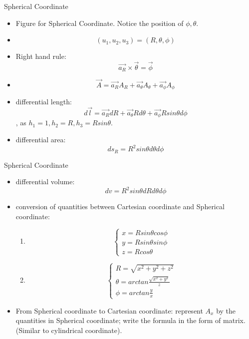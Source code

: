 \documentclass[xcolor={dvipsnames}]{beamer}
\begin{document}
\begin{frame}{Spherical Coordinate}
\begin{itemize}
    \item Figure for Spherical Coordinate. Notice the position of $\phi, \theta$.
    \item
    $$
    (u_1, u_2, u_3) = (R, \theta, \phi)
    $$
    \item Right hand rule: 
    $$
    \vec{a_R} \times \vec{\theta} = \vec{\phi}
    $$
    \item $$
    \vec{A} = \vec{a_R}A_R + \vec{a_\theta}A_\theta + \vec{a_\phi}A_\phi
    $$
    \item differential length:
    \begin{equation}\label{Eq: spherical-differential-length}
        d\vec{l} = \vec{a_R}dR + \vec{a_\theta}Rd\theta + \vec{a_\phi}Rsin\theta d\phi
    \end{equation}, as $h_1 = 1, h_2 = R, h_3 = Rsin\theta$.
    \item differential area:
    $$
    ds_R = R^2sin\theta d\theta d\phi
    $$
\end{itemize}
\end{frame}
\begin{frame}{Spherical Coordinate}
\begin{itemize}
    \item differential volume: 
    $$
    dv = R^2 sin\theta dR d\theta d\phi
    $$
    \item conversion of quantities between Cartesian coordinate and Spherical coordinate:
    \begin{enumerate}
        \item
        $$
        \begin{cases}
            x = Rsin\theta cos\phi\\
            y = Rsin\theta sin\phi\\
            z = Rcos\theta
        \end{cases}
        $$
        \item
        $$
        \begin{cases}
            R=\sqrt{x^2+y^2+z^2}\\
            \theta = arctan\frac{\sqrt{x^2+y^2}}{z}\\
            \phi = arctan\frac{y}{x}
        \end{cases}
        $$
    \end{enumerate}
    \item From Spherical coordinate to Cartesian coordinate: represent $A_x$ by the quantities in Spherical coordinate; write the formula in the form of matrix. (Similar to cylindrical coordinate).
\end{itemize}
\end{frame}
\end{document}
